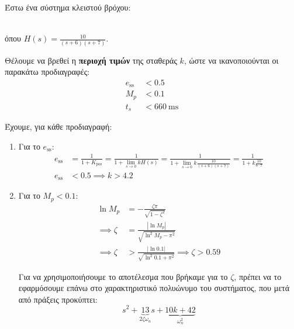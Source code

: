 \documentclass[11pt,a4paper,notitlepage,fleqn,final]{article}
\begin{document}
\begin{exercise}
Έστω ένα σύστημα κλειστού βρόχου:
 \\
όπου \( \displaystyle H(s) = \frac{10}{(s+6)(s+7)} \).

Θέλουμε να βρεθεί η \textbf{περιοχή τιμών} της σταθεράς \( k \), ώστε να ικανοποιούνται οι
παρακάτω προδιαγραφές:
\begin{align*}
	e_{\mathrm{ss}} &< 0.5 \\
	M_p &< 0.1 \\
	t_s &< 660\ \mathrm{ms}
\end{align*}

\tcblower

Έχουμε, για κάθε προδιαγραφή:
\begin{enumerate}
	\item Για το \( e_{\mathrm{ss}} \):
	\begin{align*}
		e_{\mathrm{ss}} &= \frac{1}{1+K_{\mathrm{pos}}}
		= \frac{1}{1+\lim_{s\to 0}kH(s)}
		= \frac{1}{1+\lim_{s\to 0}k\frac{10}{(s+6)(s+7)}}
		= \frac{1}{1+k\frac{10}{6\cdot 7}} \\
		e_{\mathrm{ss}} &< 0.5 \implies \boxed{k > 4.2}
	\end{align*}
	\item Για το \( M_p < 0.1 \):
	\begin{align*}
		\ln M_p &= -\frac{ζπ}{\sqrt{1-ζ^2}}\\
		\implies ζ &= \frac{\left\lvert \ln M_p \right\rvert}{
			\sqrt{\ln^2 M_p - π^2}
			}\\
		\implies ζ &> \frac{|\ln 0.1 |}{\sqrt{\ln^2 0.1 + π^2}}
		\implies \boxed{ζ > 0.59}
	\end{align*}
	
	Για να χρησιμοποιήσουμε το αποτέλεσμα που βρήκαμε για το \( ζ \), πρέπει να το
	εφαρμόσουμε επάνω στο χαρακτηριστικό πολυώνυμο του συστήματος, που μετά από πράξεις
	προκύπτει:
	\[
	s^2+
	\underbrace{13}_{2ζ\omega_n}s
	+\underbrace{10k+42}_{\omega_n^2}
	\]
	

\end{enumerate}
\end{exercise}
\end{document}
